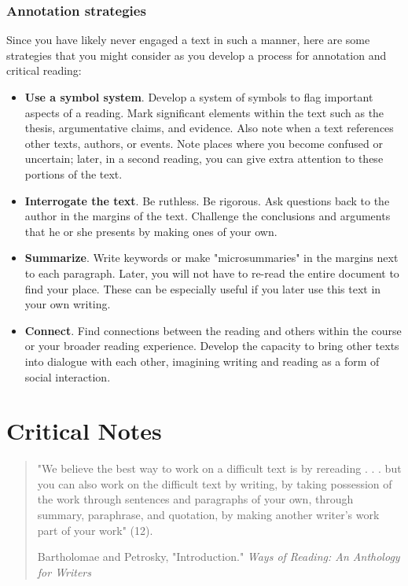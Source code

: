 \subsection{Annotation strategies}

Since you have likely never engaged a text in such a manner, here are some
strategies that you might consider as you develop a process for annotation and
critical reading:

\begin{itemize} \item \textbf{Use a symbol system}. Develop a system of symbols
to flag important aspects of a reading. Mark significant elements within the
text such as the thesis, argumentative claims, and evidence. Also note when a
text references other texts, authors, or events. Note places where you become
confused or uncertain; later, in a second reading, you can give extra attention
to these portions of the text.

\item \textbf{Interrogate the text}. Be ruthless. Be rigorous. Ask questions
back to the author in the margins of the text. Challenge the conclusions and
arguments that he or she presents by making ones of your own.

\item \textbf{Summarize}. Write keywords or make "microsummaries" in the margins
next to each paragraph. Later, you will not have to re-read the entire document
to find your place. These can be especially useful if you later use this text in
your own writing.

\item \textbf{Connect}. Find connections between the reading and others within
the course or your broader reading experience. Develop the capacity to bring
other texts into dialogue with each other, imagining writing and reading as a
form of social interaction. \end{itemize}



\chapter{Critical Notes}
\hypertarget{notes}{}

\begin{quote} \small "We believe the best way to work on a difficult text is by
rereading . . . but you can also work on the difficult text by writing, by taking
possession of the work through sentences and paragraphs of your own, through
summary, paraphrase, and quotation, by making another writer’s work part of your
work" (12).

\textemdash Bartholomae and Petrosky, "Introduction." \emph{Ways of Reading: An
Anthology for Writers}

\end{quote}

